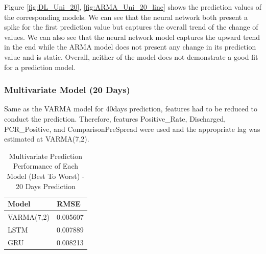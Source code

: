 Figure \ref{fig:DL_Uni_20}, \ref{fig:ARMA_Uni_20_line} shows the prediction values of the corresponding models. We can see that the neural network both present a spike for the first prediction value but captures the overall trend of the change of values. We can also see that the neural network model captures the upward trend in the end while the ARMA model does not present any change in its prediction value and is static. Overall, neither of the model does not demonstrate a good fit for a prediction model. 

\subsubsection{Multivariate Model (20 Days)}
Same as the VARMA model for 40days prediction, features had to be reduced to conduct the prediction. Therefore, features Positive\_Rate, Discharged, PCR\_Positive, and ComparisonPreSpread were used and the appropriate lag was estimated at VARMA(7,2). 
\begin{table}[h]
\caption{Multivariate Prediction Performance of Each Model (Best To Worst) - 20 Days Prediction}
    \label{tab:20Mult}
    \centering
    \begin{tabular}{ |p{3cm}||p{3cm}| }
        \hline
         Model &  RMSE\\
        \hline
        VARMA(7,2) & 0.005607\\
        LSTM  & 0.007889\\
        GRU  & 0.008213\\
    \hline
    \end{tabular}
\end{table}

